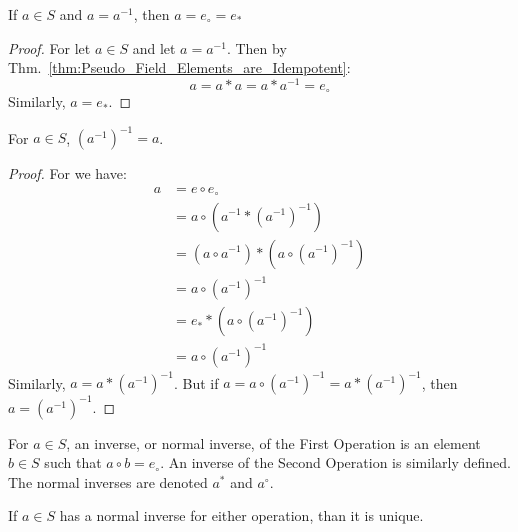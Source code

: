             \begin{theorem}
                If $a\in{S}$ and $a=a^{\minus{1}}$, then $a=e_{\circ}=e_{*}$
            \end{theorem}
            \begin{proof}
                For let $a\in{S}$ and let $a=a^{\minus{1}}$. Then by
                Thm.~\ref{thm:Pseudo_Field_Elements_are_Idempotent}:
                \begin{equation}
                    a=a*a=a*a^{-1}=e_{\circ}
                \end{equation}
                Similarly, $a=e_{*}$.
            \end{proof}
            \begin{theorem}
                For $a\in{S}$, $(a^{\minus{1}})^{\minus{1}}=a$.
            \end{theorem}
            \begin{proof}
                For we have:
                \begin{align*}
                    a&=e\circ{e}_{\circ}
                    \tag{Identity}\\
                    &=a\circ(a^{\minus{1}}*(a^{\minus{1}})^{\minus{1}})
                    \tag{Complement}\\
                    &=(a\circ a^{\minus{1}})*
                      (a\circ(a^{\minus{1}})^{\minus{1}})
                    \tag{Distributivity}\\
                     &=a\circ(a^{\minus{1}})^{\minus{1}}\\
                     &=e_{*}*(a\circ(a^{\minus{1}})^{\minus{1}})
                     \tag{Complement}\\
                     &=a\circ(a^{\minus{1}})^{\minus{1}}
                     \tag{Identity}
                \end{align*}
                Similarly, $a = a* (a^{-1})^{-1}$.
                But if $a = a\circ (a^{-1})^{-1} = a*(a^{-1})^{-1}$,
                then $a = (a^{-1})^{-1}$.
            \end{proof}
            \begin{definition} For $a\in S$, an inverse, or normal inverse, of the First Operation is an element $b\in S$ such that $a\circ b=e_{\circ}$. An inverse of the Second Operation is similarly defined. The normal inverses are denoted $a^{*}$ and $a^{\circ}$.
            \end{definition}
            \begin{theorem} If $a\in S$ has a normal inverse for either operation, than it is unique.
            \end{theorem}
